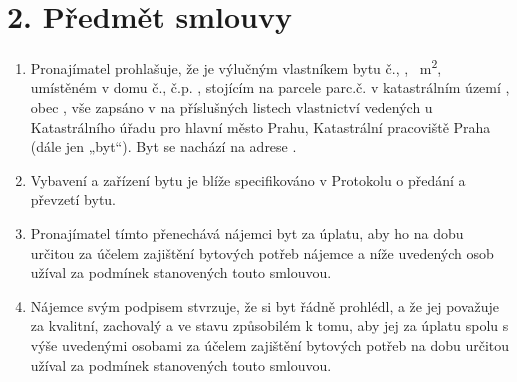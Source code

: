 \section*{2. Předmět smlouvy}

\begin{enumerate}[label=\arabic*.]
    \item Pronajímatel prohlašuje, že je výlučným vlastníkem bytu č.\Propunitnumber, \Propdisposition, \Propaream~m\textsuperscript{2}, umístěném v \Propfloor domu č.\Propbuildingnumber, č.p. \Propbuildingregistration, stojícím na parcele parc.č. \Propparcelnumber v katastrálním území \Propcadastralterritory, obec \Propmunicipality, vše zapsáno v na příslušných listech vlastnictví vedených u Katastrálního úřadu pro hlavní město Prahu, Katastrální pracoviště Praha (dále jen „byt“). Byt se nachází na adrese \Propaddress.
    \item Vybavení a zařízení bytu je blíže specifikováno v Protokolu o předání a převzetí bytu.
    \item Pronajímatel tímto přenechává nájemci byt za úplatu, aby ho na dobu určitou za účelem zajištění bytových potřeb nájemce a níže uvedených osob užíval za podmínek stanovených touto smlouvou.
    \item Nájemce svým podpisem stvrzuje, že si byt řádně prohlédl, a že jej považuje za kvalitní, zachovalý a ve stavu způsobilém k tomu, aby jej za úplatu spolu s výše uvedenými osobami za účelem zajištění bytových potřeb na dobu určitou užíval za podmínek stanovených touto smlouvou.
\end{enumerate}
